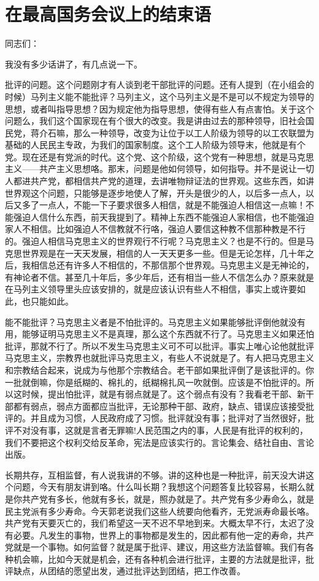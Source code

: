 \section[在最高国务会议上的结束语 ]{在最高国务会议上的结束语 }


同志们：

我没有多少话讲了，有几点说一下。

批评的问题。这个问题刚才有人谈到老干部批评的问题。还有人提到（在小组会的时候）马列主义能不能批评？马列主义，这个马列主义是不是可以不规定为领导的思想，或者叫指导思想？因为规定他为指导思想，使得有些人有点害怕。关于这个问题么，我们这个国家现在有个很大的改变。我是讲由过去的那种领导，旧社会国民党，蒋介石嘛，那么一种领导，改变为让位于以工人阶级为领导的以工农联盟为基础的人民民主专政，为我们的国家制度。这个工人阶级为领导末，他就是有个党。现在还是有党派的时代。这个党、这个阶级，这个党有一种思想，就是马克思主义——共产主义思想咯。那末，问题是他如何领导，如何指导。并不是说让一切人都进共产党，都相信共产党的道理，去讲唯物辩证法的世界观。这些东西，如讲世界观这个问题，只能够是逐步地使人了解，开头是很少的人，以后多一点人，以后又多了一点人，不能一下子要求很多人相信，就是不能强迫人相信这一点嘛！不能强迫人信什么东西，前天我提到了。精神上东西不能强迫人家相信，也不能强迫家人不相信。比如强迫人不信教就不行咯，强迫人要信这种教不信那种教是不行的。强迫人相信马克思主义的世界观行不行呢？马克思主义？也是不行的。但是马克思世界观是在一天天发展，相信的人一天天更多一些。但是无论怎样，几十年之后，我相信总还有许多人不相信的，不那信那个世界观。马克思主义是无神论的，有神论者不信。甚至几十年后，多少年后，还有相当一些人不信怎么办？原来就是在马列主义领导里头应该安排的，就是应该认识有些人不相信，事实上或许要如此，也只能如此。

能不能批评？马克思主义者是不怕批评的。马克思主义如果能够批评倒他就没有用，能够证明马克思主义不是真理，那么这个东西就不行了。马克思主义如果还怕批评，那就不行了。所以不发生马克思主义可不可以批评。事实上唯心论他就批评马克思主义，宗教界也就批评马克思主义，有些人不说就是了。有人把马克思主义和宗教结合起来，说成为与他那个宗教结合。老干部如果批评倒了是该批评的。你一批就倒嘛，你是纸糊的、棉扎的，纸糊棉扎风一吹就倒。应该是不怕批评的。所以这时候，提出怕批评，就是有弱点就是了。这个弱点有没有？我看老干部、新干部都有弱点，弱点方面都应当批评，无论那种干部、政府，缺点、错误应该接受批评的。并且成为习惯，人民政府成了习惯。批评就没有事；批评对了当然很好，批评不对没有事，这就是言者无罪嘛!人民范围之内的事，人民是有批评的权利的，我们不要把这个权利交给反革命，宪法是应该实行的。言论集会、结社自由、言论出版。

长期共存，互相监督，有人说我讲的不够。讲的这种也是一种批评，前天没大讲这个问题，今天有朋友讲到咯。什么叫长期？我想这个问题答复比较容易，长期么就是你共产党有多长，他就有多长，就是，照办就是了。共产党有多少寿命么，就是民主党派有多少寿命。今天郭老说我们这些人统要向他看齐，无党派寿命最长咯。共产党有天要灭亡的，我们希望这一天不迟不早地到来。大概太早不行，太迟了没有必要。凡发生的事物，世界上的事物都是发生的，因此都有他一定的寿命，共产党就是一个事物。如何监督？就是属于批评、建议，用这些方法监督嘛。我们有各种机会嘛，比如今天就是机会，还有各种机会进行批评，主要的方法就是批评，批评缺点，从团结的愿望出发，通过批评达到团结，把工作改善。

